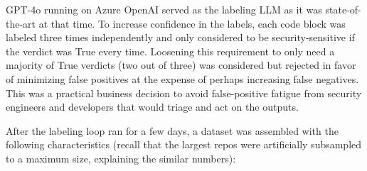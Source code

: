 \documentclass[11pt]{article}
\begin{document}
GPT-4o running on Azure OpenAI served as the labeling LLM as it was
state-of-the-art at that time. To increase confidence in the labels,
each code block was labeled three times independently and only
considered to be security-sensitive if the verdict was True every time.
Loosening this requirement to only need a majority of True
verdicts (two out of three) was considered but rejected in favor of
minimizing false positives at the expense of perhaps increasing false negatives. This was
a practical business decision to avoid false-positive fatigue from
security engineers and developers that would triage and act on the
outputs.

After the labeling loop ran for a few days, a dataset was assembled
with the following characteristics (recall that the largest repos were artificially subsampled to a maximum size, explaining
the similar numbers):
\end{document}
